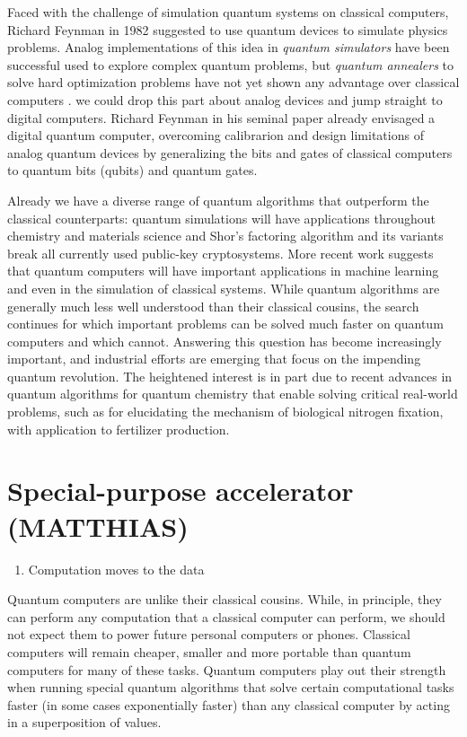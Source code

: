 \documentclass[journal]{IEEEtran}
\begin{document}
Faced with the challenge of simulation quantum systems on classical computers, Richard Feynman in 1982 \cite{Feynman1982} suggested to use quantum devices to simulate physics problems. Analog implementations of this idea in {\em quantum simulators }  \cite{RevModPhys.86.153}  have  been successful used to explore complex quantum problems, but {\em quantum annealers} to solve hard optimization problems have not  yet shown any advantage over classical computers \cite{speedup}. {\color{red} we could drop this part about analog devices and jump straight to digital computers.}  Richard Feynman \cite{Feynman1982} in his seminal paper already envisaged a digital quantum computer, overcoming calibrarion and design limitations of analog quantum devices by generalizing the bits and gates of classical computers to quantum bits (qubits) and quantum gates.

Already we have a diverse range of quantum algorithms that outperform the classical counterparts: quantum simulations will have applications throughout chemistry and materials science and Shor's factoring algorithm \cite{Shor1994} and its variants break all currently used public-key cryptosystems.  More recent work suggests that quantum computers will have important applications in machine learning and even in the simulation of classical systems. While quantum algorithms are generally much less well understood than their classical cousins, the search continues for which important problems can be solved much faster on quantum computers and which cannot. Answering this question has become increasingly important, and industrial efforts are emerging that focus on the impending quantum revolution. The heightened interest is in part due to recent advances in quantum algorithms for quantum chemistry that enable solving critical real-world problems, such as for elucidating the mechanism of biological nitrogen fixation, with application to fertilizer production.


\section{Special-purpose accelerator (MATTHIAS)}
\begin{enumerate}
\item       Computation moves to the data
\end{enumerate}



Quantum computers are unlike their classical cousins.  While, in principle,  they can perform any computation that a classical computer can perform, we should not expect them to power future personal computers or phones. Classical computers will remain cheaper, smaller and more portable than quantum computers for many of these tasks. Quantum computers play out their strength when running special quantum algorithms that solve certain computational tasks faster (in some cases exponentially faster) than any classical computer by acting in a superposition of values.  
\end{document}
